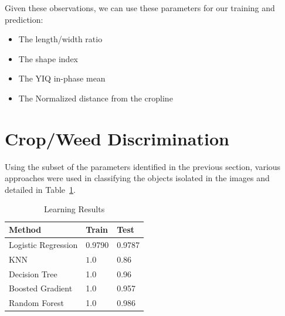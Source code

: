 \documentclass[letterpaper]{article}
\begin{document}
{  Given these observations, we can use these parameters for our training and prediction:
 \begin{itemize}
	\item{The length/width ratio}
	\item{The shape index}
	\item{The YIQ in-phase mean}
	\item{The Normalized distance from the cropline}
\end{itemize}
  
  
\section{Crop/Weed Discrimination}

Using the subset of the parameters identified in the previous section, various approaches were used in classifying the objects isolated in the images and detailed in Table~\ref{fig:learning}.

{\renewcommand{\arraystretch}{2}%
\begin{table}[H]
	\centering
    \caption{Learning Results}
    \label{fig:learning}
    \begin{tabular}{  l  p{4cm}  p{5cm} }
        \toprule
\textbf{Method}      
& \textbf{Train}   
& \textbf{Test} \\\midrule
Logistic Regression
& 0.9790       
& 0.9787 \\\hline
KNN     
& $1.0$                    
& $0.86$ \\\hline
Decision Tree
& 1.0
& 0.96 \\\hline
Boosted Gradient     
& 1.0
& 0.957 \\\hline
Random Forest      
& 1.0
& 0.986 \\\hline
    
        \bottomrule
    \end{tabular}
\end{table}

}}
\end{document}
